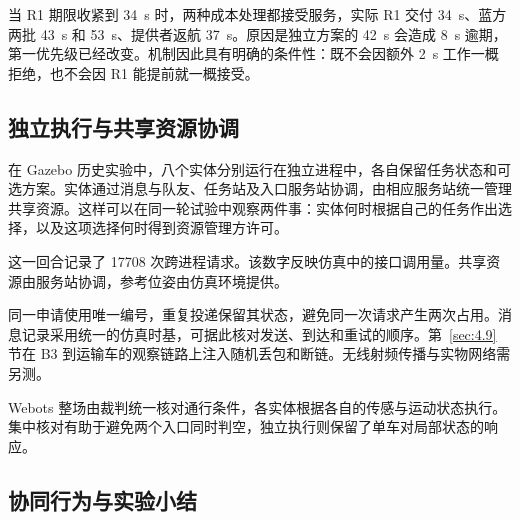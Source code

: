 当 R1 期限收紧到 34~s 时，两种成本处理都接受服务，实际 R1 交付 34~s、蓝方两批 43~s 和 53~s、提供者返航 37~s。原因是独立方案的 42~s 会造成 8~s 逾期，第一优先级已经改变。机制因此具有明确的条件性：既不会因额外 2~s 工作一概拒绝，也不会因 R1 能提前就一概接受。

\subsection{独立执行与共享资源协调}\label{sec:3.7}

在 Gazebo 历史实验中，八个实体分别运行在独立进程中，各自保留任务状态和可选方案。实体通过消息与队友、任务站及入口服务站协调，由相应服务站统一管理共享资源。这样可以在同一轮试验中观察两件事：实体何时根据自己的任务作出选择，以及这项选择何时得到资源管理方许可。

这一回合记录了 17708 次跨进程请求。该数字反映仿真中的接口调用量。共享资源由服务站协调，参考位姿由仿真环境提供。

同一申请使用唯一编号，重复投递保留其状态，避免同一次请求产生两次占用。消息记录采用统一的仿真时基，可据此核对发送、到达和重试的顺序。第~\ref{sec:4.9} 节在 B3 到运输车的观察链路上注入随机丢包和断链。无线射频传播与实物网络需另测。

Webots 整场由裁判统一核对通行条件，各实体根据各自的传感与运动状态执行。集中核对有助于避免两个入口同时判空，独立执行则保留了单车对局部状态的响应。

\subsection{协同行为与实验小结}\label{sec:3.8}

